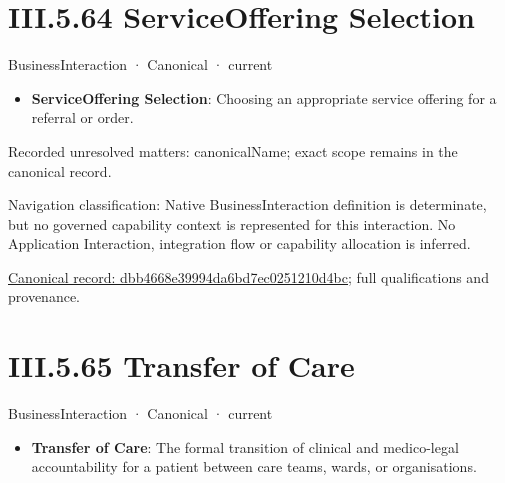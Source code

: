 \section*{III.5.64 ServiceOffering Selection}
\label{navigation:III.5.64}

\label{element:dbb4668e39994da6bd7ec0251210d4bc}
{\small BusinessInteraction · Canonical · current}\par

\begin{itemize}


\item \textbf{ServiceOffering Selection}: Choosing an appropriate service offering for a referral or order.

\end{itemize}

{\small Recorded unresolved matters: canonicalName; exact scope remains in the canonical record.}\par
{\small Navigation classification: Native BusinessInteraction definition is determinate, but no governed capability context is represented for this interaction. No Application Interaction, integration flow or capability allocation is inferred.}\par
{\footnotesize \href{../../../../../../../../continuum/business/business-interaction/dbb4668e39994da6bd7ec0251210d4bc.md}{Canonical record: dbb4668e39994da6bd7ec0251210d4bc}; full qualifications and provenance.}\par
\section*{III.5.65 Transfer of Care}
\label{navigation:III.5.65}

\label{element:8bb02a34807f4bb183bb42a722f4509b}
{\small BusinessInteraction · Canonical · current}\par

\begin{itemize}


\item \textbf{Transfer of Care}: The formal transition of clinical and medico-legal accountability for a patient between care teams, wards, or organisations.

\end{itemize}

